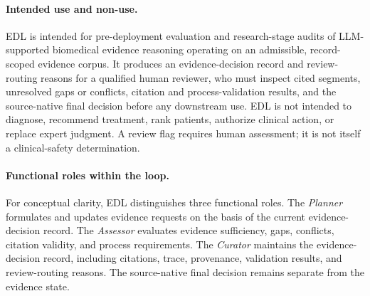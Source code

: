 \documentclass[11pt,a4paper]{article}
\begin{document}
\begin{table}[H]
\centering
\caption{General EDL methodology and this study's implementation.}
\label{tab:method-implementation}
\end{table}

\paragraph{Intended use and non-use.}
EDL is intended for pre-deployment evaluation and research-stage audits of LLM-supported biomedical evidence reasoning operating on an admissible, record-scoped evidence corpus. It produces an evidence-decision record and review-routing reasons for a qualified human reviewer, who must inspect cited segments, unresolved gaps or conflicts, citation and process-validation results, and the source-native final decision before any downstream use. EDL is not intended to diagnose, recommend treatment, rank patients, authorize clinical action, or replace expert judgment. A review flag requires human assessment; it is not itself a clinical-safety determination.

\paragraph{Functional roles within the loop.}
For conceptual clarity, EDL distinguishes three functional roles. The \textit{Planner} formulates and updates evidence requests on the basis of the current evidence-decision record. The \textit{Assessor} evaluates evidence sufficiency, gaps, conflicts, citation validity, and process requirements. The \textit{Curator} maintains the evidence-decision record, including citations, trace, provenance, validation results, and review-routing reasons. The source-native final decision remains separate from the evidence state.
\end{document}
